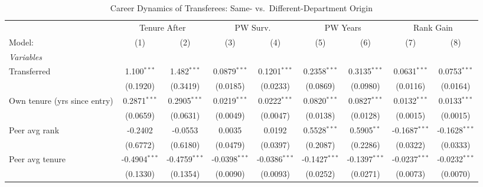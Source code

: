 \begin{table}[htbp]
\centering
\caption{Career Dynamics of Transferees: Same- vs.\ Different-Department Origin}
\label{tab:transfer-distdept}
\footnotesize
\begin{threeparttable}
\begin{tabular}{lcccccccc}
   \tabularnewline \midrule \midrule
    & \multicolumn{2}{c}{Tenure After} & \multicolumn{2}{c}{PW Surv.} & \multicolumn{2}{c}{PW Years} & \multicolumn{2}{c}{Rank Gain} \\ 
   Model:                            & (1)             & (2)             & (3)             & (4)             & (5)             & (6)             & (7)             & (8)\\  
   \midrule
   \emph{Variables}\\
   Transferred                       & 1.100$^{***}$   & 1.482$^{***}$   & 0.0879$^{***}$  & 0.1201$^{***}$  & 0.2358$^{***}$  & 0.3135$^{***}$  & 0.0631$^{***}$  & 0.0753$^{***}$\\   
                                     & (0.1920)        & (0.3419)        & (0.0185)        & (0.0233)        & (0.0869)        & (0.0980)        & (0.0116)        & (0.0164)\\   
   Own tenure (yrs since entry)      & 0.2871$^{***}$  & 0.2905$^{***}$  & 0.0219$^{***}$  & 0.0222$^{***}$  & 0.0820$^{***}$  & 0.0827$^{***}$  & 0.0132$^{***}$  & 0.0133$^{***}$\\   
                                     & (0.0659)        & (0.0631)        & (0.0049)        & (0.0047)        & (0.0138)        & (0.0128)        & (0.0015)        & (0.0015)\\   
   Peer avg rank                     & -0.2402         & -0.0553         & 0.0035          & 0.0192          & 0.5528$^{***}$  & 0.5905$^{**}$   & -0.1687$^{***}$ & -0.1628$^{***}$\\   
                                     & (0.6772)        & (0.6180)        & (0.0479)        & (0.0397)        & (0.2087)        & (0.2286)        & (0.0322)        & (0.0333)\\   
   Peer avg tenure                   & -0.4904$^{***}$ & -0.4759$^{***}$ & -0.0398$^{***}$ & -0.0386$^{***}$ & -0.1427$^{***}$ & -0.1397$^{***}$ & -0.0237$^{***}$ & -0.0232$^{***}$\\   
                                     & (0.1330)        & (0.1354)        & (0.0090)        & (0.0093)        & (0.0252)        & (0.0271)        & (0.0073)        & (0.0070)\\   

\end{tabular}
\end{threeparttable}
\end{table}
